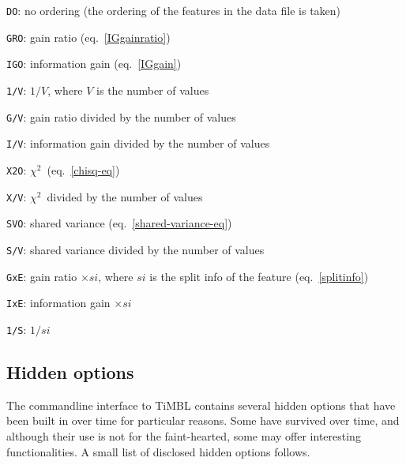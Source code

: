 \documentclass{report}
\newcommand{\chisq}{{$ \chi^2 $}}
\begin{document}
\begin{description}
	\begin{description}
         \item {\tt DO}: no ordering (the ordering of the features in
           the data file is taken)
         \item {\tt GRO}: gain ratio (eq.~\ref{IGgainratio})
         \item {\tt IGO}: information gain (eq.~\ref{IGgain})
         \item {\tt 1/V}: $1/V$, where $V$ is the number of values
         \item {\tt G/V}: gain ratio divided by the number of values
         \item {\tt I/V}: information gain divided by the number of
           values
         \item {\tt X2O}: \chisq \ (eq.~\ref{chisq-eq})
         \item {\tt X/V}: \chisq \ divided by the number of values
         \item {\tt SVO}: shared variance
           (eq.~\ref{shared-variance-eq})
         \item {\tt S/V}: shared variance divided by the number of
           values
         \item {\tt GxE}: gain ratio $\times si$, where $si$ is the
           split info of the feature (eq.~\ref{splitinfo})
         \item {\tt IxE}: information gain $\times si$
         \item {\tt 1/S}: $1/si$
	\end{description}

\end{description}

\subsection{Hidden options}

The commandline interface to TiMBL contains several hidden options
that have been built in over time for particular reasons. Some have
survived over time, and although their use is not for the
faint-hearted, some may offer interesting functionalities. A small
list of disclosed hidden options follows.
\end{document}
